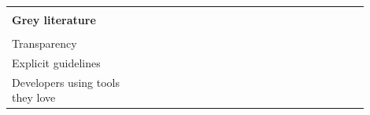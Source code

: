 \documentclass[english, 12pt, a4paper, sci, utf8, a-1b, online]{aaltothesis}
\begin{document}
\begin{center}
\begin{longtable}{p{0.3\linewidth}p{0.6\linewidth}}
                                            &                                                                                                                                                                                                                                                                                                                              \\
    \textbf{Grey literature}                                                                                                                                                                                                                                                                                                                                               \\
    \hline                                                                                                                                                                                                                                                                                                                                                                 \\
    Transparency                            & \textcite{workflows-for-the-new-developer-experience} \newline \textcite{4-apis-doing-developer-experience-really-well} \newline \textcite{dx-devs-are-people-too}                                                                                                                                                           \\
    Explicit guidelines                     & \textcite{the-best-practices-for-a-great-dx} \newline \textcite{what-exactly-is-developer-experience}                                                                                                                                                                                                                        \\
    Developers using tools they love        & \textcite{heroku-dx} \newline \textcite{great-dx-and-the-people-who-make-them} \newline \textcite{how-i-missed-it-before} \newline \textcite{building-the-developer-experience-from-the-ground-up} \newline \textcite{what-is-api-developer-experience-and-why-it-matters}                                                   \\

\end{longtable}
\end{center}
\end{document}
